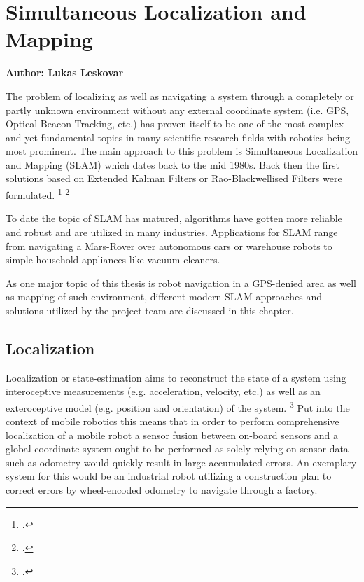 \chapter{Simultaneous Localization and Mapping}
\label{chapter:slam}

\textbf{Author: Lukas Leskovar} 

The problem of localizing as well as navigating a system through a completely or partly unknown environment without any external coordinate system (i.e. GPS, Optical Beacon Tracking, etc.) has proven itself to be one of the most complex and yet fundamental topics in many scientific research fields with robotics being most prominent. The main approach to this problem is Simultaneous Localization and Mapping (SLAM) which dates back to the mid 1980s. Back then the first solutions based on Extended Kalman Filters or Rao-Blackwellised Filters were formulated. \footcite{durrantSlam2006}  \footcite{cadenaSlamFuture2016}

To date the topic of SLAM has matured, algorithms have gotten more reliable and robust and are utilized in many industries. Applications for SLAM range from navigating a Mars-Rover over autonomous cars or warehouse robots to simple household appliances like vacuum cleaners. 

As one major topic of this thesis is robot navigation in a GPS-denied area as well as mapping of such environment, different modern SLAM approaches and solutions utilized by the project team are discussed in this chapter.

\section{Localization}
Localization or state-estimation aims to reconstruct the state of a system using interoceptive measurements (e.g. acceleration, velocity, etc.) as well as an exteroceptive model (e.g. position and orientation) of the system. \footcite[Pages 3 - 5]{barfootStateEstimation2017}
Put into the context of mobile robotics this means that in order to perform comprehensive localization of a mobile robot a sensor fusion between on-board sensors and a global coordinate system ought to be performed as solely relying on sensor data such as odometry would quickly result in large accumulated errors.
An exemplary system for this would be an industrial robot utilizing a construction plan to correct errors by wheel-encoded odometry to navigate through a factory. 

